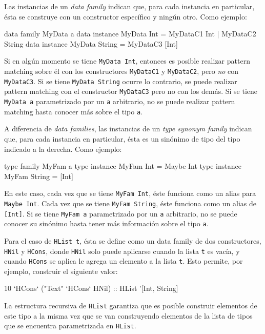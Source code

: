 Las instancias de un \textit{data family} indican que, para cada instancia en particular, ésta se construye con un constructor específico y ningún otro. Como ejemplo:

\begin{code}
data family MyData a
data instance MyData Int = 
  MyDataC1 Int | MyDataC2 String
data instance MyData String = MyDataC3 [Int]
\end{code}

Si en algún momento se tiene \texttt{MyData Int}, entonces es posible realizar pattern matching sobre él con los constructores \texttt{MyDataC1} y \texttt{MyDataC2}, pero \textit{no} con \texttt{MyDataC3}. Si se tiene \texttt{MyData String} ocurre lo contrario, se puede realizar pattern matching con el constructor \texttt{MyDataC3} pero no con los demás. Si se tiene \texttt{MyData a} parametrizado por un \texttt{a} arbitrario, no se puede realizar pattern matching hasta conocer más sobre el tipo \texttt{a}.

A diferencia de \textit{data families}, las instancias de un \textit{type synonym family} indican que, para cada instancia en particular, ésta es un sinónimo de tipo del tipo indicado a la derecha. Como ejemplo:

\begin{code}
type family MyFam a
type instance MyFam Int = Maybe Int
type instance MyFam String = [Int]
\end{code}

En este caso, cada vez que se tiene \texttt{MyFam Int}, éste funciona como un alias para \texttt{Maybe Int}. Cada vez que se tiene \texttt{MyFam String}, éste funciona como un alias de \texttt{[Int]}. Si se tiene \texttt{MyFam a} parametrizado por un \texttt{a} arbitrario, no se puede conocer su sinónimo hasta tener más información sobre el tipo \texttt{a}.

Para el caso de \texttt{HList t}, ésta se define como un data family de dos constructores, \texttt{HNil} y \texttt{HCons}, donde \texttt{HNil} solo puede aplicarse cuando la lista \texttt{t} es vacía, y cuando \texttt{HCons} se aplica le agrega un elemento a la lista \texttt{t}. Esto permite, por ejemplo, construir el siguiente valor:

\begin{code}
10 `HCons` ("Text" `HCons` HNil) :: HList '[Int, String]
\end{code}

La estructura recursiva de \texttt{HList} garantiza que es posible construir elementos de este tipo a la misma vez que se van construyendo elementos de la lista de tipos que se encuentra parametrizada en \texttt{HList}.

